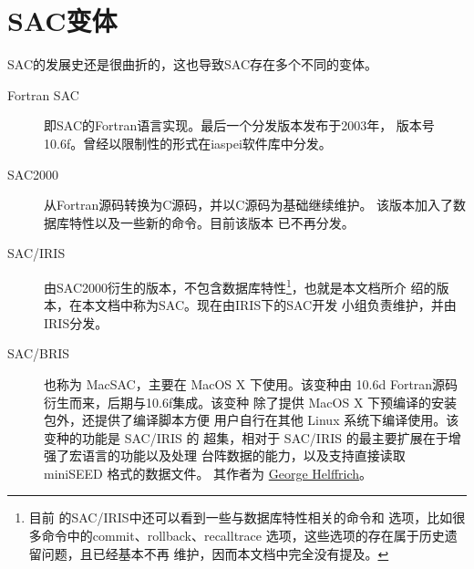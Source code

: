\section{SAC变体}

SAC的发展史还是很曲折的，这也导致SAC存在多个不同的变体。

\begin{description}
\item[Fortran SAC]  即SAC的Fortran语言实现。最后一个分发版本发布于2003年，
                    版本号10.6f。曾经以限制性的形式在iaspei软件库中分发。
\item[SAC2000]      从Fortran源码转换为C源码，并以C源码为基础继续维护。
                    该版本加入了数据库特性以及一些新的命令。目前该版本
                    已不再分发。
\item[SAC/IRIS]     由SAC2000衍生的版本，不包含数据库特性\footnote{目前
                    的SAC/IRIS中还可以看到一些与数据库特性相关的命令和
                    选项，比如很多命令中的commit、rollback、recalltrace
                    选项，这些选项的存在属于历史遗留问题，且已经基本不再
                    维护，因而本文档中完全没有提及。}，也就是本文档所介
                    绍的版本，在本文档中称为SAC。现在由IRIS下的SAC开发
                    小组负责维护，并由IRIS分发。
\item[SAC/BRIS]     也称为 MacSAC，主要在 MacOS X 下使用。该变种由
                    10.6d Fortran源码衍生而来，后期与10.6f集成。该变种
                    除了提供 MacOS X 下预编译的安装包外，还提供了编译脚本方便
                    用户自行在其他 Linux 系统下编译使用。该变种的功能是 SAC/IRIS 的
                    超集，相对于 SAC/IRIS 的最主要扩展在于增强了宏语言的功能以及处理
                    台阵数据的能力，以及支持直接读取 miniSEED 格式的数据文件。
                    其作者为
                    \href{http://www1.gly.bris.ac.uk/~george/gh.html}{George Helffrich}。
\end{description}

